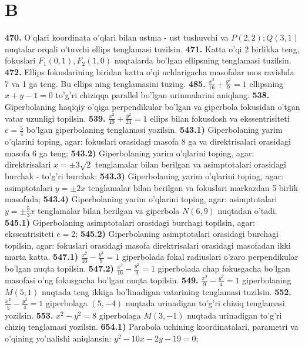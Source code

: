 \section{B}


\textbf{470.} O'qlari koordinata o'qlari bilan ustma - ust tushuvchi va $P(2,2) ; Q(3,1)$ nuqtalar orqali o'tuvchi ellips tenglamasi tuzilsin.
\textbf{471.} Katta o'qi 2 birlikka teng, fokuslari $F_1(0,1), F_2(1,0)$ nuqtalarda bo'lgan ellipsning tenglamasi tuzilsin.
\textbf{472.} Ellips fokuslarining biridan katta o'qi uchlarigacha masofalar mos ravishda 7 va 1 ga teng. Bu ellips ning tenglamasini tuzing.
\textbf{485.} $\frac{x^2}{16}+\frac{y^2}{9}=1$ ellipsning $x+y-1=0$ to'g'ri chiziqqa parallel bo'lgan urinmalarini aniqlang.
\textbf{538.} Giperbolaning haqiqiy o'qiga perpendikular bo'lgan va giperbola fokusidan o'tgan vatar uzunligi topilsin.
\textbf{539.} $\frac{x^2}{49}+\frac{y^2}{24}=1$ ellips bilan fokusdosh va ekssentrisiteti $e=\frac{5}{4}$ bo'lgan giperbolaning tenglamasi yozilsin.
\textbf{543.1)} Giperbolaning yarim o'qlarini toping, agar: fokuslari orasidagi masofa 8 ga va direktrisalari orasidagi masofa 6 ga teng;
\textbf{543.2)} Giperbolaning yarim o'qlarini toping, agar: direktrisalari $x= \pm 3 \sqrt{2}$ tenglamalar bilan berilgan va asimptotalari orasidagi burchak - to'g'ri burchak;
\textbf{543.3)} Giperbolaning yarim o'qlarini toping, agar: asimptotalari $y= \pm 2 x$ tenglamalar bilan berilgan va fokuslari markazdan 5 birlik masofada;
\textbf{543.4)} Giperbolaning yarim o'qlarini toping, agar: asimptotalari $y= \pm \frac{5}{3} x$ tenglamalar bilan berilgan va giperbola $N(6,9)$ nuqtadan o'tadi.
\textbf{545.1)} Giperbolaning asimptotalari orasidagi burchagi topilsin, agar: ekssentrisiteti $e=2$;
\textbf{545.2)} Giperbolaning asimptotalari orasidagi burchagi topilsin, agar: fokuslari orasidagi masofa direktrisalari orasidagi masofadan ikki marta katta.
\textbf{547.1)} $\frac{x^2}{16}-\frac{y^2}{9}=1$ giperbolada fokal radiuslari o'zaro perpendikular bo'lgan nuqta topilsin.
\textbf{547.2)} $\frac{x^2}{16}-\frac{y^2}{9}=1$ giperbolada chap fokusgacha bo'lgan masofasi o'ng fokusgacha bo'lgan nuqta topilsin.
\textbf{549.} $\frac{x^2}{9}-\frac{y^2}{4}=1$ giperbolaning $M(5,1)$ nuqtada teng ikkiga bo'linadigan vatarining tenglamasi tuzilsin.
\textbf{552.} $\frac{x^2}{5}-\frac{y^2}{4}=1$ giperbolaga $(5,-4)$ nuqtada urinadigan to'g'ri chiziq tenglamasi yozilsin.
\textbf{553.} $x^2-y^2=8$ giperbolaga $M(3,-1)$ nuqtada urinadigan to'g'ri chiziq tenglamasi yozilsin.
\textbf{654.1)} Parabola uchining koordinatalari, parametri va o'qining yo'nalishi aniqlansin: $y^2-10 x-2 y-19=0$;
